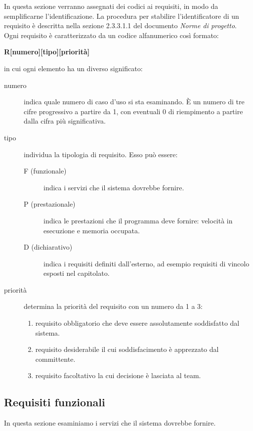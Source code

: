\documentclass[../analisi-dei-requisiti.tex]{subfiles}
\begin{document}
In questa sezione verranno assegnati dei codici ai requisiti, in modo da semplificarne l’identificazione.
La procedura per stabilire l'identificatore di un requisito è descritta nella sezione 2.3.3.1.1 del documento \textit{Norme di progetto}.
Ogni requisito è caratterizzato da un codice alfanumerico così formato:
\begin{center}
  \textbf{R[numero][tipo][priorità]}
\end{center}
in cui ogni elemento ha un diverso significato:
\begin{description}
  \item [numero] indica quale numero di caso d’uso si sta esaminando. È un numero di tre cifre progressivo a partire da 1, con eventuali 0 di riempimento a partire dalla cifra più significativa.
  \item [tipo] individua la tipologia di requisito. Esso può essere:
        \begin{description}
          \item [F (funzionale)] indica i servizi che il sistema dovrebbe fornire.
          \item [P (prestazionale)] indica le prestazioni che il programma deve fornire: velocità in esecuzione e memoria occupata.
          \item [D (dichiarativo)] indica i requisiti definiti dall'esterno, ad esempio requisiti di vincolo esposti nel capitolato.
        \end{description}
  \item [priorità] determina la priorità del requisito con un numero da 1 a 3:
        \begin{enumerate}
          \item requisito obbligatorio che deve essere assolutamente soddisfatto dal sistema.
          \item requisito desiderabile il cui soddisfacimento è apprezzato dal committente.
          \item requisito facoltativo la cui decisione è lasciata al team.
        \end{enumerate}
\end{description}

\subsection{Requisiti funzionali}%
\label{sub:requisiti_funzionali}
In questa sezione esaminiamo i servizi che il sistema dovrebbe fornire.
\end{document}
